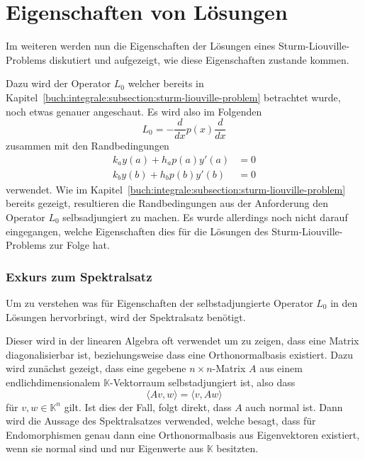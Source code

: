 %
%
%
\section{Eigenschaften von Lösungen
\label{sturmliouville:section:solution-properties}}

Im weiteren werden nun die Eigenschaften der Lösungen eines
Sturm-Liouville-Problems diskutiert und aufgezeigt, wie diese Eigenschaften
zustande kommen.

Dazu wird der Operator $L_0$ welcher bereits in 
Kapitel~\ref{buch:integrale:subsection:sturm-liouville-problem} betrachtet
wurde, noch etwas genauer angeschaut.
Es wird also im Folgenden
\[
    L_0
    =
    -\frac{d}{dx}p(x)\frac{d}{dx}
\]
zusammen mit den Randbedingungen
\[
    \begin{aligned}
        k_a y(a) + h_a p(a) y'(a) &= 0 \\
        k_b y(b) + h_b p(b) y'(b) &= 0
    \end{aligned}
\]
verwendet.
Wie im Kapitel~\ref{buch:integrale:subsection:sturm-liouville-problem} bereits 
gezeigt, resultieren die Randbedingungen aus der Anforderung den Operator $L_0$
selbsadjungiert zu machen.
Es wurde allerdings noch nicht darauf eingegangen, welche Eigenschaften dies
für die Lösungen des Sturm-Liouville-Problems zur Folge hat.

\subsubsection{Exkurs zum Spektralsatz}

Um zu verstehen was für Eigenschaften der selbstadjungierte Operator $L_0$ in 
den Lösungen hervorbringt, wird der Spektralsatz benötigt.

Dieser wird in der linearen Algebra oft verwendet um zu zeigen, dass eine Matrix
diagonalisierbar ist, beziehungsweise dass eine Orthonormalbasis existiert.
Dazu wird zunächst gezeigt, dass eine gegebene $n\times n$-Matrix $A$ aus einem
endlichdimensionalem $\mathbb{K}$-Vektorraum selbstadjungiert ist, also dass
\[
    \langle Av, w \rangle
    =
    \langle v, Aw \rangle
\]
für $ v, w \in \mathbb{K}^n$ gilt.
Ist dies der Fall, folgt direkt, dass $A$ auch normal ist.
Dann wird die Aussage des Spektralsatzes
\cite{sturmliouville:spektralsatz-wiki} verwended, welche besagt, dass für
Endomorphismen genau dann eine Orthonormalbasis aus Eigenvektoren existiert,
wenn sie normal sind und nur Eigenwerte aus $\mathbb{K}$ besitzten.

